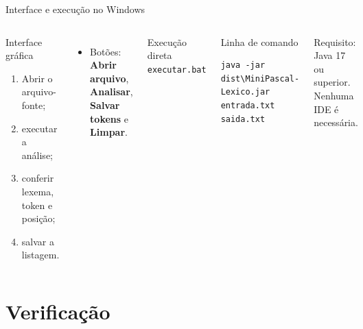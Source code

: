 \documentclass[aspectratio=169,11pt]{beamer}
\begin{document}
\begin{frame}[fragile]{Interface e execução no Windows}
  \begin{columns}[T,onlytextwidth]
      \begin{block}{Interface gráfica}
        \begin{enumerate}
          \item Abrir o arquivo-fonte;
          \item executar a análise;
          \item conferir lexema, token e posição;
          \item salvar a listagem.
        \end{enumerate}
      \end{block}

      \begin{itemize}
        \item Botões: \textbf{Abrir arquivo}, \textbf{Analisar}, \textbf{Salvar tokens} e \textbf{Limpar}.
      \end{itemize}

      \begin{block}{Execução direta}
        \texttt{executar.bat}
      \end{block}

      \begin{block}{Linha de comando}
        \begin{lstlisting}
java -jar dist\MiniPascal-Lexico.jar entrada.txt saida.txt
        \end{lstlisting}
      \end{block}

      \footnotesize Requisito: Java 17 ou superior. Nenhuma IDE é necessária.
  \end{columns}
\end{frame}

\section{Verificação}
\end{document}

